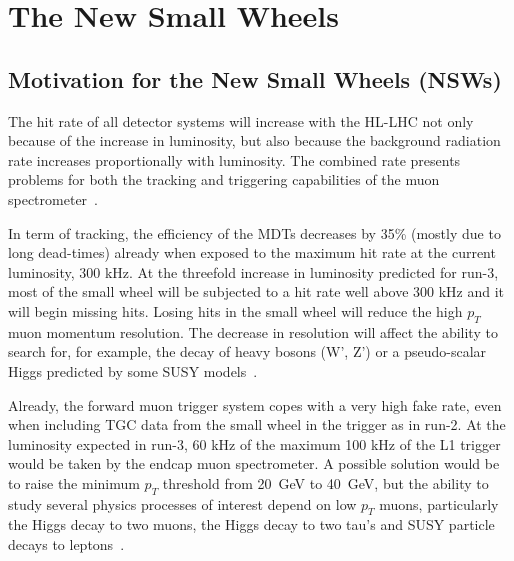 
\chapter{The New Small Wheels}
\label{chap:nsw}

\section{Motivation for the New Small Wheels (NSWs)}

The hit rate of all detector systems will increase with the HL-LHC not only because of the increase in luminosity, but also because the background radiation rate increases proportionally with luminosity. The combined rate presents problems for both the tracking and triggering capabilities of the muon spectrometer~\cite{nsw_tdr}.

In term of tracking, the efficiency of the MDTs decreases by 35\% (mostly due to long dead-times) already when exposed to the maximum hit rate at the current luminosity, 300 kHz.
At the threefold increase in luminosity predicted for run-3, most of the small wheel will be subjected to a hit rate well above 300 kHz and it will begin missing hits. Losing hits in the small wheel will reduce the high $p_T$ muon momentum resolution. The decrease in resolution will affect the ability to search for, for example, the decay of heavy bosons (W', Z') or a pseudo-scalar Higgs predicted by some SUSY models~\cite{dainese_physics_2018}.

Already, the forward muon trigger system copes with a very high fake rate, even when including TGC data from the small wheel in the trigger as in run-2. At the luminosity expected in run-3, 60 kHz of the maximum 100 kHz of the L1 trigger would be taken by the endcap muon spectrometer. A possible solution would be to raise the minimum $p_T$ threshold from \SI{20}{\giga\electronvolt} to \SI{40}{\giga\electronvolt}, but the ability to study several physics processes of interest depend on low $p_T$ muons, particularly the Higgs decay to two muons, the Higgs decay to two tau's and SUSY particle decays to leptons~\cite{nsw_tdr}.

